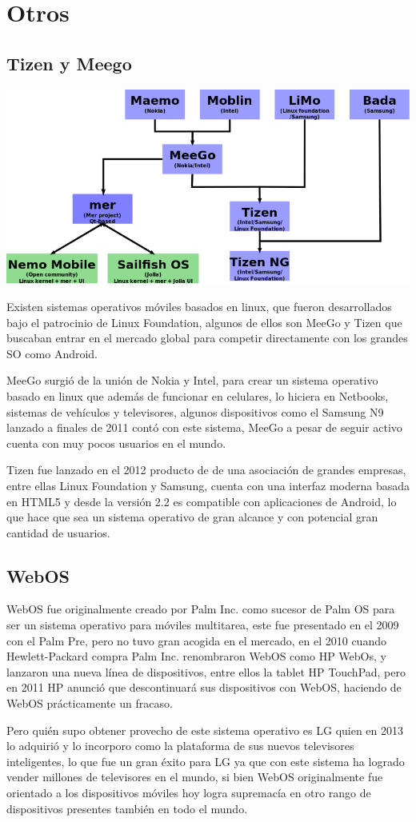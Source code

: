 \section*{Otros}
\subsection*{Tizen y Meego}

\includegraphics[scale=0.4]{img/cp01/img0103.png}

Existen sistemas operativos móviles basados en linux, que fueron desarrollados bajo el patrocinio de Linux Foundation, algunos de ellos son MeeGo y Tizen que buscaban entrar en 
el mercado global para competir directamente con los grandes SO como Android.

MeeGo surgió de la unión de Nokia y Intel, para crear un sistema operativo basado en linux que además de funcionar en celulares, lo hiciera en Netbooks, sistemas de vehículos y 
televisores, algunos dispositivos como el Samsung N9 lanzado a finales de 2011 contó con este sistema, MeeGo a pesar de seguir activo cuenta con muy pocos usuarios en el mundo.

Tizen fue lanzado en el 2012 producto de de una asociación de grandes empresas, entre ellas Linux Foundation y Samsung, cuenta con una interfaz moderna basada en HTML5 y desde la 
versión 2.2 es compatible con aplicaciones de Android, lo que hace que sea un sistema operativo de gran alcance y con potencial gran cantidad de usuarios.

\subsection*{WebOS}
WebOS fue originalmente creado por Palm Inc. como sucesor de Palm OS para ser un sistema operativo para móviles multitarea, este fue presentado en el 2009 con el Palm Pre, pero 
no tuvo gran acogida en el mercado, en el 2010 cuando Hewlett-Packard compra Palm Inc. renombraron WebOS como HP WebOs, y lanzaron una nueva línea de dispositivos, entre ellos la 
tablet HP TouchPad, pero en 2011 HP anunció que descontinuará sus dispositivos con WebOS, haciendo de WebOS prácticamente un fracaso.

Pero quién supo obtener provecho de este sistema operativo es LG quien en 2013 lo adquirió y lo incorporo como la plataforma de sus nuevos televisores inteligentes, lo que fue un 
gran éxito para LG ya que con este sistema ha logrado vender millones de televisores en el mundo, si bien WebOS originalmente fue orientado a los dispositivos móviles hoy logra 
supremacía en otro rango de dispositivos presentes también en todo el mundo.